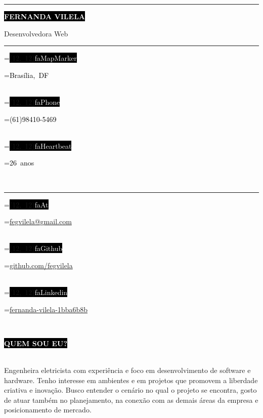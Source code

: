 \documentclass[10pt,A4]{article}
\newcommand*{\vcenteredhbox}[1]{\begingroup
	\setbox0=\hbox{#1}\parbox{\wd0}{\box0}\endgroup}
\newcommand{\icon}[2]{\colorbox{black}{\makebox(#2, #2){\textcolor{white}{\large\csname fa#1\endcsname}}}}	%
\newcommand{\icontext}[3]{ 						%
	\vcenteredhbox{\icon{#1}{#2}}\hspace{0.2cm}\vcenteredhbox{\textcolor{black}{#3}}
}
\newcounter{a}
\newcounter{b}
\newcounter{c}
\newcounter{barcount}
\newenvironment{barchart}[8]{

	\newcommand{\barwidth}{0.35}
	\newcommand{\barsep}{0.2}

	\newcommand{\baritem}[5]{

		\pgfmathparse{##3+##4+##5}
		\let\perc\pgfmathresult

		\pgfmathparse{#2}
		\let\barsize\pgfmathresult

		\pgfmathparse{\barsize*##3/100}
		\let\barone\pgfmathresult

		\pgfmathparse{\barsize*##4/100}
		\let\bartwo\pgfmathresult

		\pgfmathparse{\barsize*##5/100}
		\let\barthree\pgfmathresult

		\pgfmathparse{(\barwidth*\thebarcount)+(\barsep*\thebarcount)}
		\let\barx\pgfmathresult

		\filldraw[fill=#6, draw=none] (0,-\barx) rectangle (\barone,-\barx-\barwidth);
		\filldraw[fill=#7, draw=none] (\barone, -\barx) rectangle (\barone+\bartwo,-\barx-\barwidth);
		\filldraw[fill=#8, draw=none] (\barone+\bartwo,-\barx ) rectangle (\barone+\bartwo+\barthree,-\barx-\barwidth);

		\node [label=180:\colorbox{#5}{\textcolor{#4}{##2}}] at (0,-\barx-0.175) {};
		\addtocounter{barcount}{1}
	}
	\begin{tikzpicture}
	\setcounter{barcount}{0}

}
{\end{tikzpicture}}
\newcommand{\cvsection}[1] {
	\textcolor{white}{\MakeUppercase{\textbf{#1}}}
}
\newcommand{\cvsect}[1]{
	\colorbox{black}{{\cvsection{#1}}}\\\\%
}
\begin{document}
	\begin{minipage}[t]{0.61\textwidth}\hrule height 0pt width 0pt%
		\colorbox{black}{{\HUGE\textcolor{white}{\textbf{\MakeUppercase{Fernanda \break Vilela}}}}}%

		\vspace{1mm}\LARGE{Desenvolvedora Web}
	\end{minipage}%
	\begin{minipage}[t]{0.2\textwidth}\hrule height 0pt width 0pt%
		\small%
		\icontext{MapMarker}{12}{Brasília, DF}\\
		\icontext{Phone}{12}{(61)98410-5469}\\
		\icontext{Heartbeat}{12}{26 anos}\\
	\end{minipage}%
	\begin{minipage}[t]{0.3\textwidth}\hrule height 0pt width 0pt%
		\small%
		\icontext{At}{12}{\href{mailto:fegvilela@gmail.com}{fegvilela@gmail.com}}\\
		\icontext{Github}{12}{\href{https://github.com/fegvilela}{github.com/fegvilela}}\\
		\icontext{Linkedin}{12}{\href{https://www.linkedin.com/in/fernanda-vilela-1bba6b8b/}{fernanda-vilela-1bba6b8b}}\\
	\end{minipage}%

	\small%
	\vspace{0.5cm}


	\cvsect{Quem sou eu?}%
	\begin{minipage}[t]{1\textwidth}%
		Engenheira eletricista com experiência e foco em desenvolvimento de software e hardware. Tenho interesse em ambientes e em projetos que promovem a liberdade criativa e inovação. Busco entender o cenário no qual o projeto se encontra, gosto de atuar também no planejamento, na conexão com as demais áreas da empresa e posicionamento de mercado.\\
	\end{minipage}%
	\hfill
\end{document}
